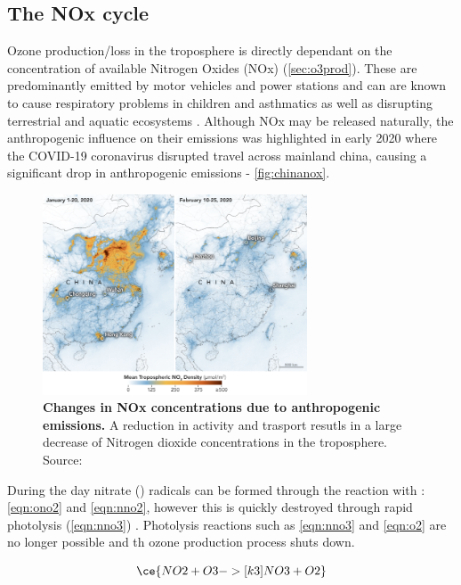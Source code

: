 \subsection{The NOx cycle}\label{sec:noxcycle}
Ozone production/loss in the troposphere is directly dependant on the concentration of available Nitrogen Oxides (NOx) (\autoref{sec:o3prod}). These are predominantly emitted by motor vehicles and power stations and can are known to cause respiratory problems in children and asthmatics as well as disrupting terrestrial and aquatic ecosystems \citep{eea}. Although NOx may be released naturally, the anthropogenic influence on their emissions was highlighted in early 2020 where the COVID-19 coronavirus disrupted travel across mainland china, causing a significant drop in anthropogenic emissions - \autoref{fig:chinanox}.

\begin{figure}[H]
    \centering
    \includegraphics[width=0.7\textwidth]{china_trop_2020056.png}
    \caption{\textbf{Changes in NOx concentrations due to anthropogenic emissions.} A reduction in activity and trasport resutls in a large decrease of Nitrogen dioxide concentrations in the troposphere. Source: \citep{chinanox}}
    \label{fig:chinanox}
\end{figure}

During the day nitrate () radicals can be formed through the reaction with : \autoref{eqn:ono2} and \autoref{eqn:nno2}, however this is quickly destroyed through rapid photolysis (\autoref{eqn:nno3}) \citep{nitrate}. Photolysis reactions such as \autoref{eqn:nno3} and \autoref{eqn:o2} are no longer possible and th ozone production process shuts down.

\begin{equation}
  \ce{NO2 + O3 ->[k3] NO3 + O2}
  \label{eqn:nno2}
\end{equation}

